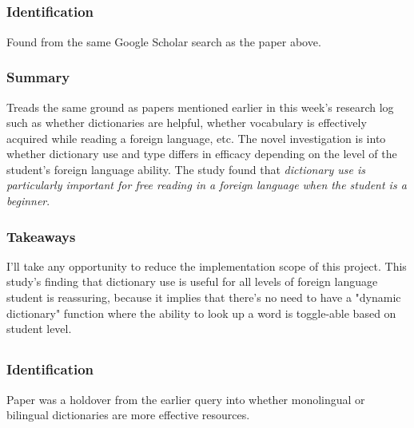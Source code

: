 \documentclass[
	letterpaper, %
]{jdf}
\begin{document}
\subsection{}
\subsubsection{Identification}
Found from the same Google Scholar search as the paper above.

\subsubsection{Summary}
Treads the same ground as papers mentioned earlier in this week's research log such as whether dictionaries are helpful, whether vocabulary is effectively acquired while reading a foreign language, etc. The novel investigation is into whether dictionary use and type differs in efficacy depending on the level of the student's foreign language ability. The study found that \textit{dictionary use is particularly important for free reading in a foreign language when the student is a beginner}.

\subsubsection{Takeaways}
I'll take any opportunity to reduce the implementation scope of this project. This study's finding that dictionary use is useful for all levels of foreign language student is reassuring, because it implies that there's no need to have a "dynamic dictionary" function where the ability to look up a word is toggle-able based on student level. 

\subsection{}
\subsubsection{Identification}
Paper was a holdover from the earlier query into whether monolingual or bilingual dictionaries are more effective resources.
\end{document}
